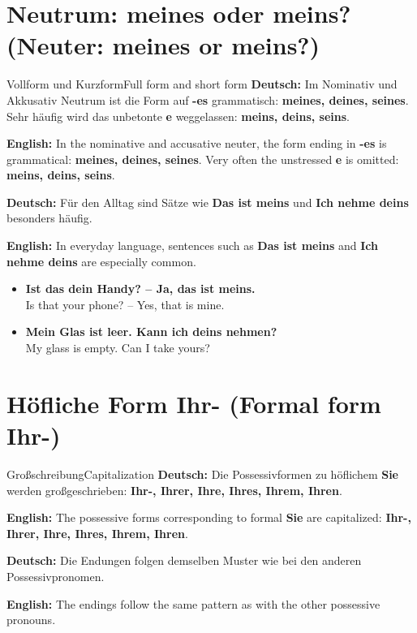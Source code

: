 \documentclass[a4paper,11pt]{article}
\newcommand{\GermanText}[1]{\textbf{Deutsch: }#1\par}
\newcommand{\EnglishText}[1]{{\small\color{SoftGray}\textbf{English: }#1\par}}
\newcommand{\ExampleItem}[2]{\item \textbf{#1}\\{\small\color{SoftGray}#2}}
\begin{document}
    \section{Neutrum: meines oder meins? \textnormal{(Neuter: meines or meins?)}}

        \begin{grammarentry}{Vollform und Kurzform}{Full form and short form}
            \GermanText{Im Nominativ und Akkusativ Neutrum ist die Form auf \textbf{-es} grammatisch: \textbf{meines, deines, seines}. Sehr häufig wird das unbetonte \textbf{e} weggelassen: \textbf{meins, deins, seins}.}
            \EnglishText{In the nominative and accusative neuter, the form ending in \textbf{-es} is grammatical: \textbf{meines, deines, seines}. Very often the unstressed \textbf{e} is omitted: \textbf{meins, deins, seins}.}

            \GermanText{Für den Alltag sind Sätze wie \textbf{Das ist meins} und \textbf{Ich nehme deins} besonders häufig.}
            \EnglishText{In everyday language, sentences such as \textbf{Das ist meins} and \textbf{Ich nehme deins} are especially common.}
        \end{grammarentry}

        \begin{exbox}
            \begin{itemize}
                \ExampleItem{Ist das dein Handy? -- Ja, das ist meins.}{Is that your phone? -- Yes, that is mine.}
                \ExampleItem{Mein Glas ist leer. Kann ich deins nehmen?}{My glass is empty. Can I take yours?}
            \end{itemize}
        \end{exbox}

    \section{Höfliche Form Ihr- \textnormal{(Formal form Ihr-)}}

        \begin{grammarentry}{Großschreibung}{Capitalization}
            \GermanText{Die Possessivformen zu höflichem \textbf{Sie} werden großgeschrieben: \textbf{Ihr-, Ihrer, Ihre, Ihres, Ihrem, Ihren}.}
            \EnglishText{The possessive forms corresponding to formal \textbf{Sie} are capitalized: \textbf{Ihr-, Ihrer, Ihre, Ihres, Ihrem, Ihren}.}

            \GermanText{Die Endungen folgen demselben Muster wie bei den anderen Possessivpronomen.}
            \EnglishText{The endings follow the same pattern as with the other possessive pronouns.}
        \end{grammarentry}
\end{document}
